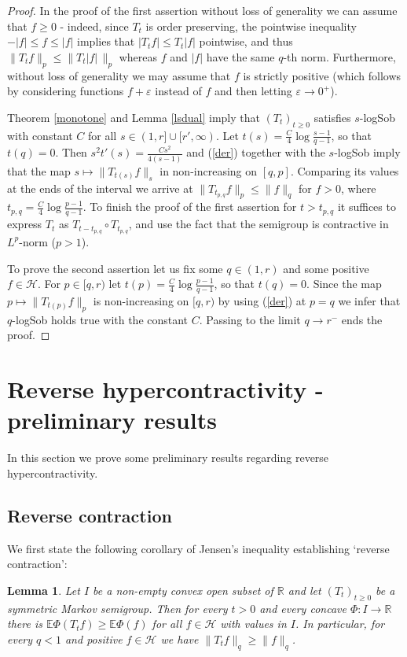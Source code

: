 \documentclass[11pt]{amsart}
\newcommand{\R}{\mathbb{R}}
\newcommand{\E}{\mathbb{E}}
\newcommand{\1}{\mathbf{1}}
\def\R{{\mathbb R}}
\def\E{{\mathbb E}}
\def\H{{\mathcal{H}}}
\theoremstyle{definition}
\theoremstyle{plain}
\newtheorem{lemma}[example]{Lemma}
\theoremstyle{remark}
\numberwithin{equation}{section}
\begin{document}
\begin{proof}
In the proof of the first assertion without loss of generality we can assume that $f \geq 0$ - indeed, since
$T_{t}$ is order preserving, the pointwise inequality
$-|f| \leq f \leq |f|$ implies that $|T_{t}f| \leq T_{t}|f|$ pointwise, and thus $\| T_{t}f\|_{p} \leq \| T_{t}|f|\,\|_{p}$ whereas $f$ and $|f|$ have the same $q$-th norm. Furthermore, without loss of generality we may assume that
$f$ is strictly positive (which follows by considering functions $f+\varepsilon$ instead of $f$ and then letting
$\varepsilon \to 0^{+}$).

Theorem \ref{monotone} and Lemma \ref{lsdual} imply that
$(T_{t})_{t \geq 0}$ satisfies $s$-logSob with constant $C$ for all $s \in (1,r] \cup [r',\infty)$.
Let $t(s)=\frac{C}{4}\log \frac{s-1}{q-1}$, so that
$t(q)=0$. Then $s^{2}t'(s)=\frac{Cs^{2}}{4(s-1)}$ and
(\ref{der}) together with the $s$-logSob imply that the map
$s \mapsto \| T_{t(s)}f\|_{s}$ in non-increasing on $[q,p]$.
Comparing its values at the ends of the interval we arrive
at $\| T_{t_{p,q}}f\|_{p} \leq \| f\|_{q}$ for $f>0$, where
$t_{p,q}=\frac{C}{4}\log \frac{p-1}{q-1}$. To finish the proof of the first assertion for $t>t_{p,q}$ it suffices to express $T_{t}$ as $T_{t-t_{p,q}}\circ T_{t_{p,q}}$, and use the fact that the semigroup is contractive in $L^{p}$-norm ($p>1$).

To prove the second assertion let us fix some $q \in (1,r)$ and some positive $f \in \H$. For $p \in [q,r)$ let
$t(p)=\frac{C}{4}\log \frac{p-1}{q-1}$, so that $t(q)=0$.
Since the map $p \mapsto \| T_{t(p)}f\|_{p}$ is non-increasing on $[q,r)$ by using (\ref{der}) at $p=q$ we infer that $q$-logSob holds true with the constant $C$. Passing to the limit $q \to r^{-}$ ends the proof.
\end{proof}

\section{Reverse hypercontractivity - preliminary results}
In this section we prove some preliminary results regarding reverse hypercontractivity.

\subsection{Reverse contraction}

We first state the following corollary of Jensen's inequality establishing `reverse contraction':
\begin{lemma} \label{concave}
Let $I$ be a non-empty convex open subset of $\R$ and let
$(T_{t})_{t \geq 0}$ be a symmetric Markov semigroup. Then for every $t>0$ and every concave $\Phi: I \rightarrow \R$
there is $\E \Phi(T_{t}f) \geq \E \Phi(f)$ for all
$f \in \H$ with values in $I$. In particular, for every
$q <1 $ and positive $f \in \H$ we have
$\| T_{t}f\|_{q} \geq \| f\|_{q}$.
\end{lemma}
\end{document}
